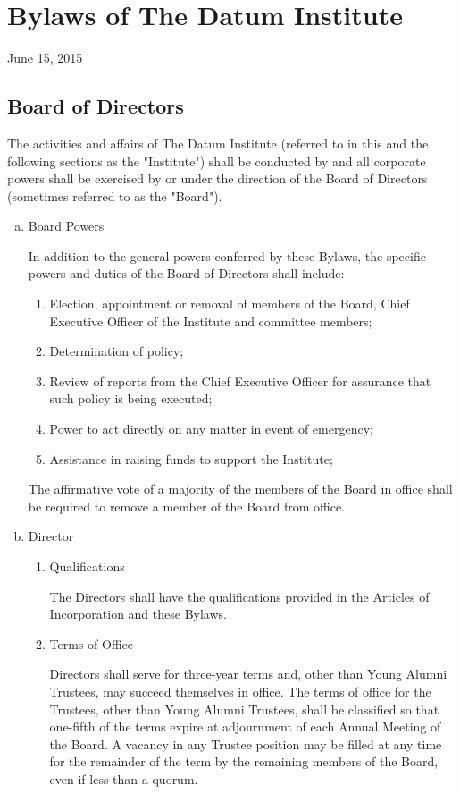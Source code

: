 \section{Bylaws of The Datum Institute}

June 15, 2015

\subsection{Board of Directors}

The activities and affairs of The Datum Institute (referred to in this and the following sections as the "Institute") shall be conducted by and all corporate powers shall be exercised by or under the direction of the Board of Directors (sometimes referred to as the "Board"). 

\begin{enumerate}[(a)]
\item Board Powers

In addition to the general powers conferred by these Bylaws, the specific powers and duties of the Board of Directors shall include:

\begin{enumerate}
\item Election, appointment or removal of members of the Board, Chief Executive Officer of the Institute and committee members; 
\item Determination of policy;
\item Review of reports from the Chief Executive Officer for assurance that such policy is being executed;
\item Power to act directly on any matter in event of emergency;
\item Assistance in raising funds to support the Institute;
\end{enumerate}

The affirmative vote of a majority of the members of the Board in office shall be required to remove a member of the Board from office.

\item Director

\begin{enumerate}
\item Qualifications

The Directors shall have the qualifications provided in the Articles of Incorporation and these Bylaws. 

\item Terms of Office

Directors shall serve for three-year terms and, other than Young Alumni Trustees, may succeed themselves in office.  The terms of office for the Trustees, other than Young Alumni Trustees, shall be classified so that one-fifth of the terms expire at adjournment of each Annual Meeting of the Board.  A vacancy in any Trustee position may be filled at any time for the remainder of the term by the remaining members of the Board, even if less than a quorum.

\end{enumerate}

\end{enumerate}

